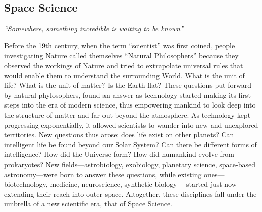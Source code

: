 \documentclass[letter,11pt]{article}
\newcommand{\attrib}[1]{\nopagebreak{\raggedleft\footnotesize #1\par}}
\begin{document}

\subsection{Space Science}
\label{ps-space-science}
\begin{center}
\em ``Somewhere, something incredible is waiting to be known''
\end{center}
\attrib{\textbf{-- Carl Sagan\index{Sagan, Carl}}}

Before the 19th century, when the term ``scientist'' was first coined, people
investigating Nature called themselves ``Natural Philosophers'' because they
observed the workings of Nature and tried to extrapolate universal rules that
would enable them to understand the surrounding World. What is the unit of
life? What is the unit of matter? Is the Earth flat? These questions put
forward by natural phylosophers, found an answer as technology started making
its first steps into the era of modern science, thus empowering mankind to look
deep into the structure of matter and far out beyond the atmosphere. As
technology kept progressing exponentially, it allowed scientists to wander into
new and unexplored territories. New questions thus arose: does life exist on
other planets? Can intelligent life be found beyond our Solar System? Can there
be different forms of intelligence? How did the Universe form? How did
humankind evolve from prokaryotes? New fields---astrobiology, exobiology,
planetary science, space-based astronomy---were born to answer these questions,
while existing ones---biotechnology, medicine, neuroscience, synthetic biology%
---started just now extending their reach into outer space. Altogether, these
disciplines fall under the umbrella of a new scientific era, that of Space
Science.  
\end{document}
